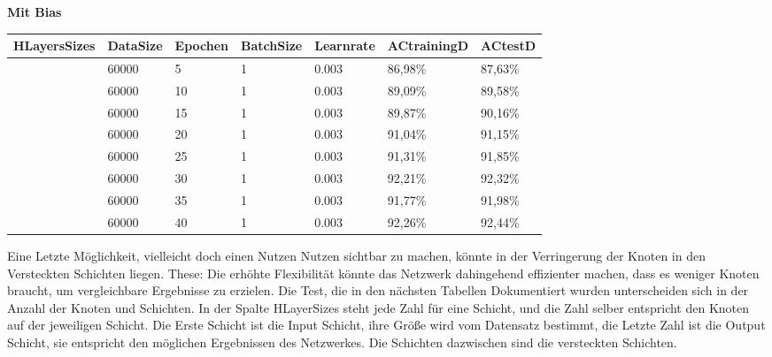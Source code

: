 \documentclass[12pt]{article}
\begin{document}
\begin{table}[H]
    \centering
    \textbf{Mit Bias}
    \begin{tabular}{|l|l|l|l|l|l|l|}
    \hline
        HLayersSizes & DataSize & Epochen & BatchSize & Learnrate & ACtrainingD & ACtestD \\ \hline
        [784, 100, 10] & 60000 & 5 & 1 & 0.003 & 86,98\% & 87,63\% \\ \hline
        [784, 100, 10] & 60000 & 10 & 1 & 0.003 & 89,09\% & 89,58\% \\ \hline
        [784, 100, 10] & 60000 & 15 & 1 & 0.003 & 89,87\% & 90,16\% \\ \hline
        [784, 100, 10] & 60000 & 20 & 1 & 0.003 & 91,04\% & 91,15\% \\ \hline
        [784, 100, 10] & 60000 & 25 & 1 & 0.003 & 91,31\% & 91,85\% \\ \hline
        [784, 100, 10] & 60000 & 30 & 1 & 0.003 & 92,21\% & 92,32\% \\ \hline
        [784, 100, 10] & 60000 & 35 & 1 & 0.003 & 91,77\% & 91,98\% \\ \hline
        [784, 100, 10] & 60000 & 40 & 1 & 0.003 & 92,26\% & 92,44\% \\ \hline
    \end{tabular}
\end{table}
Eine Letzte Möglichkeit, vielleicht doch einen Nutzen Nutzen sichtbar zu machen, könnte in der Verringerung der Knoten in den Versteckten Schichten liegen. 
These: Die erhöhte Flexibilität könnte das Netzwerk dahingehend effizienter machen, dass es weniger Knoten braucht, um vergleichbare Ergebnisse zu erzielen.
Die Test, die in den nächsten Tabellen Dokumentiert wurden unterscheiden sich in der Anzahl der Knoten und Schichten. In der Spalte HLayerSizes steht jede Zahl für eine Schicht, und die Zahl selber entspricht den Knoten auf der jeweiligen Schicht. Die Erste Schicht ist die Input Schicht, ihre Größe wird vom Datensatz bestimmt, die Letzte Zahl ist die Output Schicht, sie entspricht den möglichen Ergebnissen des Netzwerkes. Die Schichten dazwischen sind die versteckten Schichten.
\end{document}
